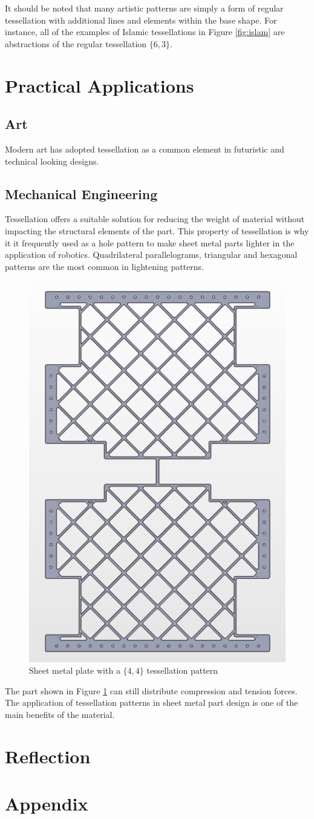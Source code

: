 \documentclass[12pt,letterpaper]{article}
\begin{document}
It should be noted that many artistic patterns are simply a form of regular tessellation with additional lines and elements within the base shape. For instance, all of the examples of Islamic tessellations in Figure \ref{fig:islam} are abstractions of the regular tessellation $\{6,3\}$.

\section{Practical Applications}
\subsection{Art}
Modern art has adopted tessellation as a common element in futuristic and technical looking designs.
\subsection{Mechanical Engineering}
Tessellation offers a suitable solution for reducing the weight of material without impacting the structural elements of the part. This property of tessellation is why it it frequently used as a hole pattern to make sheet metal parts lighter in the application of robotics. Quadrilateral parallelograms, triangular and hexagonal patterns are the most common in lightening patterns.

\begin{figure}[H]
    \begin{center}
        \caption{Sheet metal plate with a $\{4,4\}$ tessellation pattern}
        \label{fig:belly}
        \includegraphics[width=.4\linewidth]{belly}
    \end{center}
\end{figure}

The part shown in Figure \ref{fig:belly} can still distribute compression and tension forces. The application of tessellation patterns in sheet metal part design is one of the main benefits of the material.

\section{Reflection}
\newpage


\newpage
\section{Appendix}
\listoffigures
\end{document}
